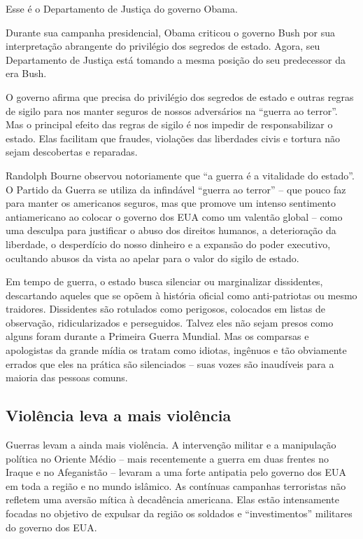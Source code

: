 Esse é o Departamento de Justiça do governo Obama.

Durante sua campanha presidencial, Obama criticou o governo Bush por sua interpretação abrangente do privilégio dos segredos de estado. Agora, seu Departamento de Justiça está tomando a mesma posição do seu predecessor da era Bush.

O governo afirma que precisa do privilégio dos segredos de estado e outras regras de sigilo para nos manter seguros de nossos adversários na ``guerra ao terror''. Mas o principal efeito das regras de sigilo é nos impedir de responsabilizar o estado. Elas facilitam que fraudes, violações das liberdades civis e tortura não sejam descobertas e reparadas.

Randolph Bourne observou notoriamente que ``a guerra é a vitalidade do estado''. O Partido da Guerra se utiliza da infindável ``guerra ao terror'' -- que pouco faz para manter os americanos seguros, mas que promove um intenso sentimento antiamericano ao colocar o governo dos EUA como um valentão global -- como uma desculpa para justificar o abuso dos direitos humanos, a deterioração da liberdade, o desperdício do nosso dinheiro e a expansão do poder executivo, ocultando abusos da vista ao apelar para o valor do sigilo de estado.

Em tempo de guerra, o estado busca silenciar ou marginalizar dissidentes, descartando aqueles que se opõem à história oficial como anti-patriotas ou mesmo traidores. Dissidentes são rotulados como perigosos, colocados em listas de observação, ridicularizados e perseguidos. Talvez eles não sejam presos como alguns foram durante a Primeira Guerra Mundial. Mas os comparsas e apologistas da grande mídia os tratam como idiotas, ingênuos e tão obviamente errados que eles na prática são silenciados -- suas vozes são inaudíveis para a maioria das pessoas comuns.

\subsection*{Violência leva a mais violência}

Guerras levam a ainda mais violência. A intervenção militar e a manipulação política no Oriente Médio -- mais recentemente a guerra em duas frentes no Iraque e no Afeganistão -- levaram a uma forte antipatia pelo governo dos EUA em toda a região e no mundo islâmico. As contínuas campanhas terroristas não refletem uma aversão mítica à decadência americana. Elas estão intensamente focadas no objetivo de expulsar da região os soldados e ``investimentos'' militares do governo dos EUA.


